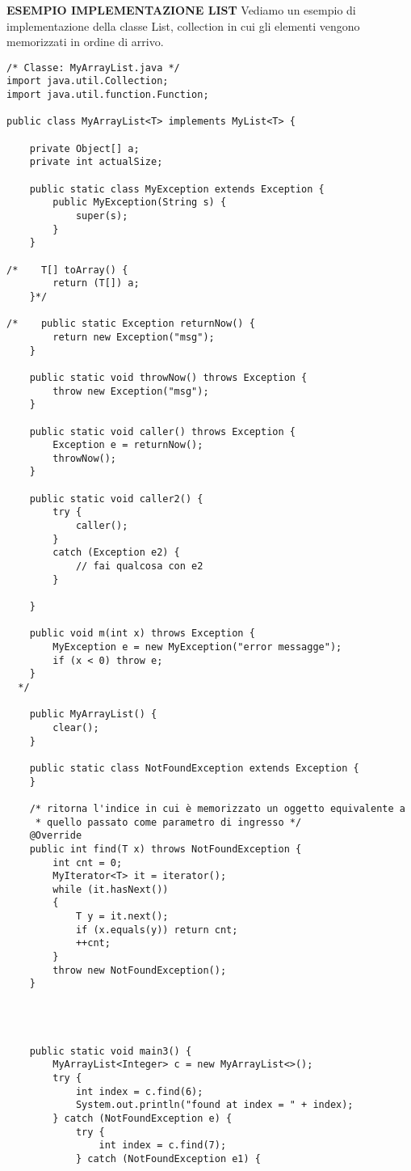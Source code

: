 \noindent \textbf{ESEMPIO IMPLEMENTAZIONE LIST}\newline
Vediamo un esempio di implementazione della classe List, collection in cui gli elementi vengono memorizzati in ordine di arrivo.

\begin{lstlisting}[basicstyle=\small,]
/* Classe: MyArrayList.java */
import java.util.Collection;
import java.util.function.Function;

public class MyArrayList<T> implements MyList<T> {

    private Object[] a;
    private int actualSize;

    public static class MyException extends Exception {
        public MyException(String s) {
            super(s);
        }
    }

/*    T[] toArray() {
        return (T[]) a;
    }*/

/*    public static Exception returnNow() {
        return new Exception("msg");
    }

    public static void throwNow() throws Exception {
        throw new Exception("msg");
    }

    public static void caller() throws Exception {
        Exception e = returnNow();
        throwNow();
    }

    public static void caller2() {
        try {
            caller();
        }
        catch (Exception e2) {
            // fai qualcosa con e2
        }

    }

    public void m(int x) throws Exception {
        MyException e = new MyException("error messagge");
        if (x < 0) throw e;
    }
  */

    public MyArrayList() {
        clear();
    }

    public static class NotFoundException extends Exception {
    }

	/* ritorna l'indice in cui è memorizzato un oggetto equivalente a 
	 * quello passato come parametro di ingresso */
    @Override
    public int find(T x) throws NotFoundException {
        int cnt = 0;
        MyIterator<T> it = iterator();
        while (it.hasNext())
        {
            T y = it.next();
            if (x.equals(y)) return cnt;
            ++cnt;
        }
        throw new NotFoundException();
    }




    public static void main3() {
        MyArrayList<Integer> c = new MyArrayList<>();
        try {
            int index = c.find(6);
            System.out.println("found at index = " + index);
        } catch (NotFoundException e) {
            try {
                int index = c.find(7);
            } catch (NotFoundException e1) {


\end{lstlisting}
